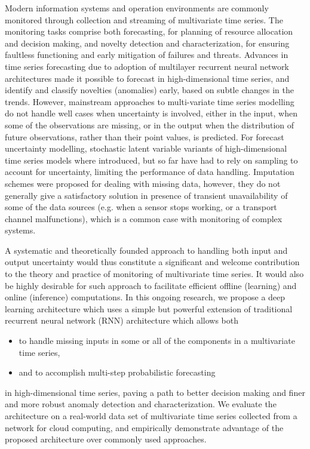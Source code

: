 \documentclass[runningheads]{llncs}
\begin{document}
Modern information systems and operation environments are
commonly monitored through collection and streaming of
multivariate time series. The monitoring tasks comprise both
forecasting, for planning of resource allocation and decision
making, and novelty detection and characterization, for ensuring
faultless functioning and early mitigation of failures and
threats.  Advances in time series forecasting
due to adoption of multilayer recurrent neural network
architectures made it possible to forecast in high-dimensional
time series, and identify and classify novelties (anomalies)
early, based on subtle changes in the trends.  However,
mainstream approaches to multi-variate time series modelling
do not handle well cases when uncertainty is involved, either in
the input, when some of the observations are missing, or in the
output when the distribution of future observations, rather than
their point values, is predicted. For forecast uncertainty
modelling, stochastic latent variable
variants of high-dimensional time series models where
introduced, but so far have had to rely on sampling to account
for uncertainty, limiting the performance of data handling.
Imputation schemes were proposed for dealing with 
missing data, however, they do not generally give a satisfactory
solution in presence of transient unavailability of some of
the data sources (e.g. when a sensor stops working, or a
transport channel malfunctions), which is  a common case with
monitoring of complex systems.  

A systematic and theoretically founded approach to handling
both input and output uncertainty would thus constitute a
significant and welcome contribution to the theory and practice
of monitoring of multivariate time series. It would also be
highly desirable for such approach to facilitate efficient
offline (learning) and online (inference) computations. In this
ongoing research, we propose a deep learning architecture which
uses a simple but powerful extension of traditional recurrent
neural network (RNN) architecture which allows both 
\begin{itemize} 
\item to handle missing inputs
in some or all of the components in a multivariate time series,
\item and to accomplish multi-step probabilistic forecasting
\end{itemize}
in high-dimensional time series, paving a path to better
decision making and finer and more robust anomaly detection and
characterization.  We evaluate the architecture on a real-world
data set of multivariate time series collected from a 
network for cloud computing, and empirically demonstrate
advantage of the proposed architecture over commonly used
approaches.
\end{document}
